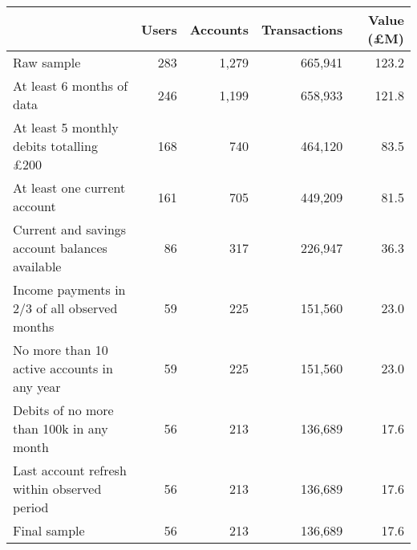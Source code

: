\begin{tabular}{lrrrr}
\toprule
                                               & Users & Accounts & Transactions & Value (\pounds M) \\
\midrule
                                    Raw sample &   283 &    1,279 &      665,941 &             123.2 \\
                     At least 6 months of data &   246 &    1,199 &      658,933 &             121.8 \\
At least 5 monthly debits totalling \pounds200 &   168 &      740 &      464,120 &              83.5 \\
                  At least one current account &   161 &      705 &      449,209 &              81.5 \\
Current and savings account balances available &    86 &      317 &      226,947 &              36.3 \\
 Income payments in 2/3 of all observed months &    59 &      225 &      151,560 &              23.0 \\
   No more than 10 active accounts in any year &    59 &      225 &      151,560 &              23.0 \\
      Debits of no more than 100k in any month &    56 &      213 &      136,689 &              17.6 \\
   Last account refresh within observed period &    56 &      213 &      136,689 &              17.6 \\
                                  Final sample &    56 &      213 &      136,689 &              17.6 \\
\bottomrule
\end{tabular}
